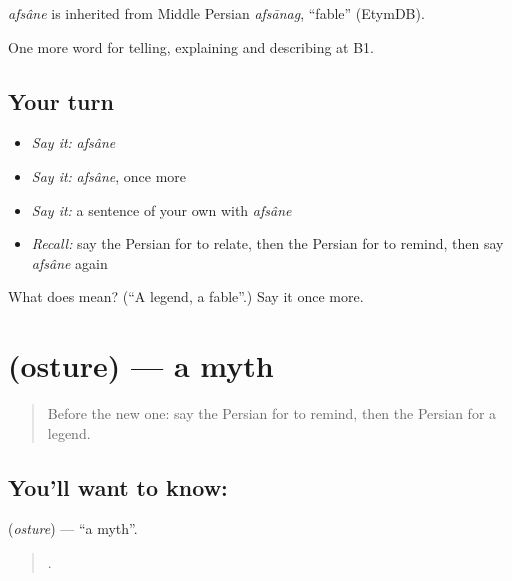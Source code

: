 \begin{cousinweb}
\emph{afsâne} is inherited from Middle Persian \emph{afsānag}, \textquotedblleft{}fable\textquotedblright{} (EtymDB).
\end{cousinweb}

\begin{grammarlens}[title={What you've built}]
One more word for telling, explaining and describing at B1.
\end{grammarlens}

\subsection*{Your turn}
\begin{itemize}
\raggedright
  \item \emph{Say it:} \emph{afsâne}
  \item \emph{Say it:} \emph{afsâne}, once more
  \item \emph{Say it:} a sentence of your own with \emph{afsâne}
  \item \emph{Recall:} say the Persian for to relate, then the Persian for to remind, then say \emph{afsâne} again
\end{itemize}

\begin{tcolorbox}[breakable,colback=teal!4,colframe=teal!35!black,title={Before you move on}]
What does  mean? (\textquotedblleft{}A legend, a fable\textquotedblright{}.) Say it once more.
\end{tcolorbox}
\section[\texorpdfstring{\fa{اسطوره} (osture)}{اسطوره (osture)}]{ (osture) — a myth}

\label{lesson:FA-C347-osture}



\begin{quote}
Before the new one: say the Persian for to remind, then the Persian for a legend.
\end{quote}

\subsection*{You'll want to know: }
\textbf{} (\emph{osture}) — \textquotedblleft{}a myth\textquotedblright{}.

\begin{quote}
     .
\end{quote}

